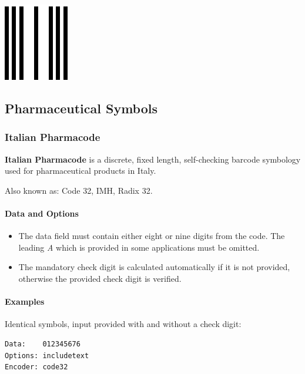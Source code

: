 \includegraphics{images/fimd-1.eps}

\hypertarget{pharmaceutical-symbols}{%
\subsection{Pharmaceutical Symbols}\label{pharmaceutical-symbols}}

\hypertarget{italian-pharmacode}{%
\subsubsection{Italian Pharmacode}\label{italian-pharmacode}}

\textbf{Italian Pharmacode} is a discrete, fixed length, self-checking
barcode symbology used for pharmaceutical products in Italy.

Also known as: Code 32, IMH, Radix 32.

\hypertarget{data-and-options-54}{%
\paragraph{Data and Options}\label{data-and-options-54}}

\begin{itemize}
\tightlist
\item
  The data field must contain either eight or nine digits from the code.
  The leading \emph{A} which is provided in some applications must be
  omitted.
\item
  The mandatory check digit is calculated automatically if it is not
  provided, otherwise the provided check digit is verified.
\end{itemize}

\hypertarget{examples-36}{%
\paragraph{Examples}\label{examples-36}}

Identical symbols, input provided with and without a check digit:

\begin{verbatim}
Data:    012345676
Options: includetext
Encoder: code32
\end{verbatim}

